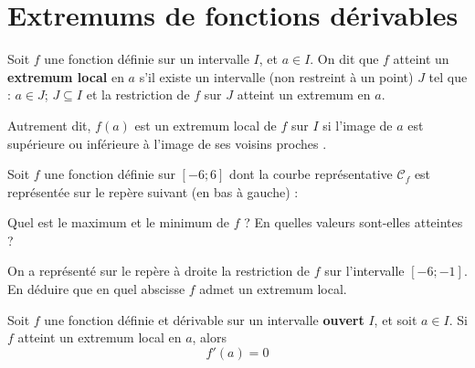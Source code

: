 \documentclass{article}
\begin{document}
\section{Extremums de fonctions dérivables}
\begin{tcolorbox}
\begin{definition}
Soit $f$ une fonction définie sur un intervalle $I$, et $a \in I$. On dit que $f$ atteint un \textbf{extremum local} en $a$ s'il existe un intervalle (non restreint à un point) $J$ tel que : $a \in J$; $J \subseteq I$ et la restriction de $f$ sur $J$ atteint un extremum en $a$.   
\end{definition}
\end{tcolorbox}
\begin{remark}
Autrement dit, $f(a)$ est un extremum local de $f$ sur $I$ si l'image de $a$ est supérieure ou inférieure à l'image de ses voisins \og proches \fg.
\end{remark}
\begin{example}
Soit $f$ une fonction définie sur $[-6;6]$ dont la courbe représentative $\mathcal{C}_f$ est représentée sur le repère suivant (en bas à gauche) :
\begin{center}
\hfill
{}
\hfill
{}
\hfill
\end{center}
\begin{enumquestions}
\item Quel est le maximum et le minimum de $f$ ? En quelles valeurs sont-elles atteintes ?
\item On a représenté sur le repère à droite la restriction de $f$ sur l'intervalle $[-6;-1]$. En déduire que en quel abscisse $f$ admet un extremum local.  
\end{enumquestions}
\emptybox{2cm}
\end{example}
\begin{tcolorbox}
\begin{proposition}
Soit $f$ une fonction définie et dérivable sur un intervalle \textbf{ouvert} $I$, et soit $a \in I$. Si $f$ atteint un extremum local en $a$, alors
\begin{equation*}
f'(a) = 0
\end{equation*} 
\end{proposition}
\end{tcolorbox}
\end{document}
